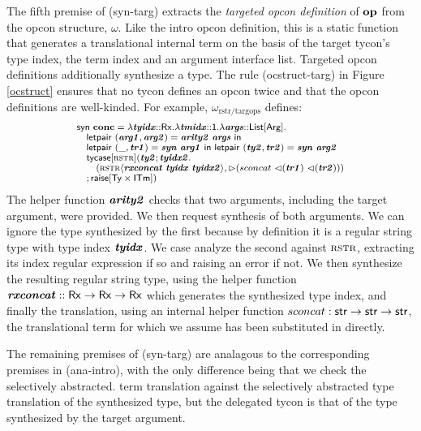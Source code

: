 \documentclass[10pt,preprint]{sigplanconf}
\begin{document}
The fifth premise of (syn-targ) extracts the \emph{targeted opcon definition} of $\textbf{op}$ from the opcon structure, $\omega$. Like the intro opcon definition, this is a static function that generates a translational internal term on the basis of the target tycon's type index, the term index and an argument interface list. Targeted opcon definitions additionally synthesize a type. The rule (ocstruct-targ) in Figure \ref{ocstruct} ensures that no tycon defines an opcon twice and that the opcon definitions are well-kinded. 
For example, $\omega_\text{rstr/targops}$ defines:
\[\small
\begin{array}{l}
\keyw{syn}~\opname{conc}=\slam{\krx}{\svar{tyidx}}{
    \slam{\kunit}{\svar{tmidx}}{
        \slam{\kargs}{\svar{args}}{\\
            \quad \keyw{letpair}~(\svar{arg1}, \svar{arg2}) = \svar{arity2}~\svar{args}~\keyw{in}\\
            \quad \keyw{letpair}~(\_, \svar{tr1}) = \svar{syn}~\svar{arg1}~\keyw{in}~ \keyw{letpair}~(\svar{ty2}, \svar{tr2}) = \svar{syn}~\svar{arg2}\\
            \quad \stycase{\tcvar{rstr}}{\svar{ty2}}{\svar{tyidx2}}{\\
                \quad\quad (\sty{\tcvar{rstr}}{\svar{rxconcat}~\svar{tyidx}~\svar{tyidx2}}, \sqitm{sconcat~\quq{\svar{tr1}}~\quq{\svar{tr2}}})\\
                \quad
            }{\sraise{\kty\times\kitm}}
        }
    }
}
\end{array}
\]
The helper function ${\textbf{\textit{arity2}}}$ checks that two arguments, including the target argument, were provided. We then request synthesis of both arguments. We can ignore the type synthesized by the first because by definition it is a regular string type with type index ${\textbf{\textit{tyidx}}}$. We case analyze the second against $\textsc{rstr}$, extracting its index regular expression if so and raising an error if not. We then synthesize the resulting regular string type, using the helper function ${\textbf{\textit{rxconcat}}} :: {\sf Rx} \rightarrow {\sf Rx} \rightarrow {\sf Rx}$ which generates the synthesized type index, and finally the translation, using an internal helper function $sconcat : {\sf str} \rightarrow {\sf str} \rightarrow {\sf str}$, the translational term for which we assume has been substituted in directly.

The remaining premises of (syn-targ) are analagous to the corresponding premises in (ana-intro), with the only difference being that we check the selectively abstracted. term translation against the selectively abstracted type translation of the synthesized type, but the delegated tycon is that of the type synthesized by the target argument. 
\end{document}
